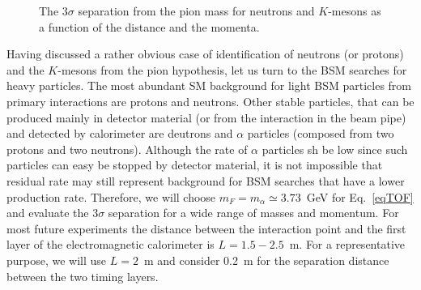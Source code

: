 \begin{figure}
\begin{center}
\end{center}
\caption{
The $3\sigma$ separation from the pion mass for neutrons and $K$-mesons as a function of the distance and the momenta.
}
\label{fig:singleparticles}
\end{figure}


Having discussed a rather obvious case of identification of neutrons (or protons) and the $K$-mesons from the pion hypothesis,
let us turn to the BSM searches for heavy particles.
The most abundant SM background for light BSM  particles from primary interactions are protons and neutrons.
Other stable particles, that can be produced mainly in 
detector material (or from the interaction in the beam pipe) 
and detected by calorimeter are deutrons and $\alpha$ particles (composed from two protons and two neutrons). 
Although the rate of $\alpha$ particles sh be low since such particles can easy be stopped by detector material,
it is not impossible that residual rate may still  represent background for BSM searches that have a lower production rate.  
Therefore, we will choose  $m_F=m_{\alpha}\simeq 3.73$~GeV  for Eq.~\ref{eqTOF} and evaluate the
$3\sigma$ separation for a wide range of masses and momentum.
For most future experiments the distance between the 
interaction point and the first layer of the electromagnetic calorimeter is 
$L=1.5-2.5$~m. For a representative purpose, we will use $L=2$~m and consider 0.2~m for the  separation
distance between the two timing layers.

